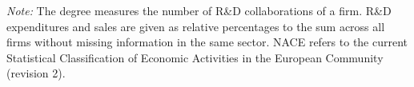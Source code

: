 \begin{table}[tbp]
{\begin{sideways}
\begin{threeparttable}
\begin{tabular}{lrrrrrr}
\midrule
\bottomrule
    \end{tabular}%
        \begin{tablenotes}[flushleft]%
	\item \emph{Note:} The degree measures the number of R\&D collaborations of a firm. R\&D expenditures and sales are given as relative percentages to the sum across all firms without missing information in the same sector. NACE refers to the current Statistical Classification of Economic Activities in the European Community (revision 2).
	\end{tablenotes}
  \label{tab:2010_deg_ranking-nace}%
\end{threeparttable}
\end{sideways}
}
\end{table}

